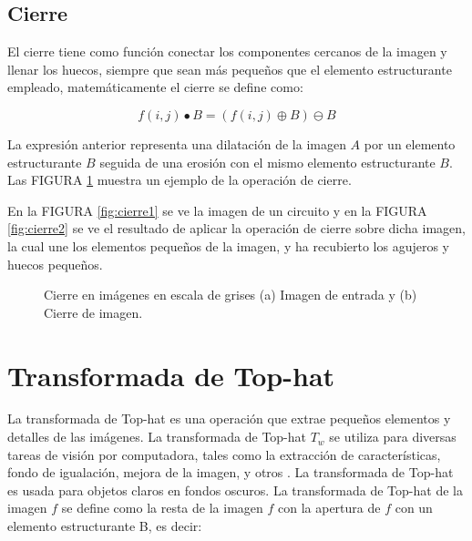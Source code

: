     
    \subsection{Cierre}
    El cierre tiene como función  conectar  los  componentes cercanos  de  la  imagen  y  llenar  los huecos,   siempre   que   sean   más   pequeños   que   el   elemento   estructurante   empleado, matemáticamente el cierre se define como:
    
    \begin{equation}
\label{eq:cierre}
 f(i,j)\bullet{B}  = (f(i,j) \oplus{B})\ominus{B}
\end{equation}
    
   
    
    La expresión anterior representa una dilatación de la imagen  $A$ por un elemento estructurante $B$ seguida de una erosión con el mismo elemento estructurante  $B$. Las FIGURA \ref{fig:cierre}  muestra un ejemplo de la operación de cierre.
    
    En la FIGURA \ref{fig:cierre1} se ve la imagen de un circuito y en la FIGURA \ref{fig:cierre2} se ve el resultado de aplicar la operación de cierre sobre dicha imagen, la cual une los elementos pequeños de la imagen, y ha recubierto los agujeros y huecos pequeños.

\begin{figure}[H]
	\centering
	\caption{Cierre en imágenes en escala de grises (a) Imagen de entrada y (b) Cierre de imagen.}
	\label{fig:cierre}
\end{figure}
    

\section{Transformada de Top-hat} 
La transformada de Top-hat es una operación que extrae pequeños elementos y detalles de las imágenes. La transformada de Top-hat $T_{w}$  
se utiliza para diversas tareas de visión por computadora, tales como la extracción de características, fondo de igualación, mejora de la imagen, y otros \cite{dougherty2003hands}.
La transformada de Top-hat es usada para objetos claros en fondos oscuros. La transformada de Top-hat de la imagen $f$ se define como la resta de la imagen $f$ con la apertura de $f$ con un elemento estructurante B, es decir:

